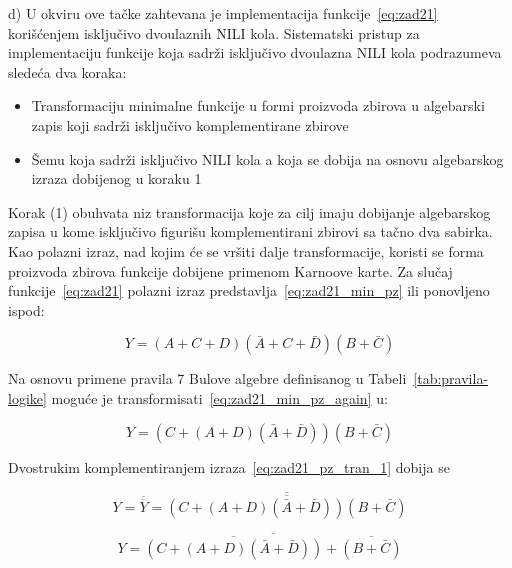 \documentclass[a4paper,11pt]{article}
\numberwithin{equation}{section} %
\begin{document}
\FloatBarrier   %

\noindent\makebox[\linewidth]{\dotfill}

d) U okviru ove tačke zahtevana je implementacija funkcije~\eqref{eq:zad21} korišćenjem isključivo
dvoulaznih NILI kola. Sistematski pristup za implementaciju funkcije koja sadrži isključivo
dvoulazna NILI kola podrazumeva sledeća dva koraka:
\begin{itemize}
\item[$1)$] Transformaciju minimalne funkcije u formi proizvoda zbirova u algebarski zapis koji
sadrži isključivo komplementirane zbirove
\item[$2)$] Šemu koja sadrži isključivo NILI kola a koja se dobija na osnovu algebarskog izraza
dobijenog u koraku 1
\end{itemize}

\vspace{1em}
\noindent
Korak (1) obuhvata niz transformacija koje za cilj imaju dobijanje algebarskog zapisa u kome
isključivo figurišu komplementirani zbirovi sa tačno dva sabirka. Kao polazni izraz, nad kojim
će se vršiti dalje transformacije, koristi se forma proizvoda zbirova funkcije dobijene primenom
Karnoove karte. Za slučaj funkcije~\eqref{eq:zad21} polazni izraz predstavlja~\eqref{eq:zad21_min_pz} ili ponovljeno ispod:

\begin{equation}
Y = (A + C + D)(\bar{A} + C + \bar{D})( B + \bar{C})
\label{eq:zad21_min_pz_again}
\end{equation}

Na osnovu primene pravila 7 Bulove algebre definisanog u Tabeli~\ref{tab:pravila-logike} moguće je
transformisati~\eqref{eq:zad21_min_pz_again} u:

\begin{equation}
Y = (C + (A + D)(\bar{A} + \bar{D}))( B + \bar{C})
\label{eq:zad21_pz_tran_1}
\end{equation}

Dvostrukim komplementiranjem izraza~\eqref{eq:zad21_pz_tran_1} dobija se

\begin{equation}
Y = \overline{\overline{Y}} = \overline{\overline{ (C + (A + D)(\bar{A} + \bar{D}))( B + \bar{C}) }}
\label{eq:zad21_pz_tran_2}
\end{equation}

\begin{equation}
Y = 
\overline{
\overline{ (C + (A + D)(\bar{A} + \bar{D}))} 
+ 
\overline{ ( B + \bar{C}) }
}
\label{eq:zad21_pz_tran_3}
\end{equation}
\end{document}
